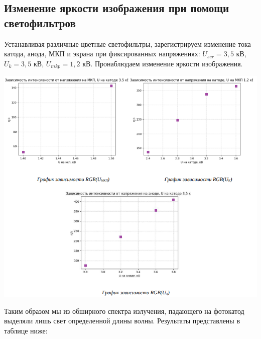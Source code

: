 

\subsection* {Изменение яркости изображения при помощи светофильтров}

Устанавливая различные цветные светофильтры, зарегистрируем изменение тока катода, анода, МКП и экрана при фиксированных напряжениях: $U_{scr} = 3,5$ кВ, $U_{k} = 3,5$ кВ, $U_{mkp} = 1,2$ кВ. Пронаблюдаем изменение яркости изображения.

\begin{center}
    \includegraphics[scale = 1]{3 pic.png}
\end{center}

Таким образом мы из обширного спектра излучения, падающего на фотокатод выделяли лишь свет определенной длины волны. Результаты представлены в таблице ниже:

